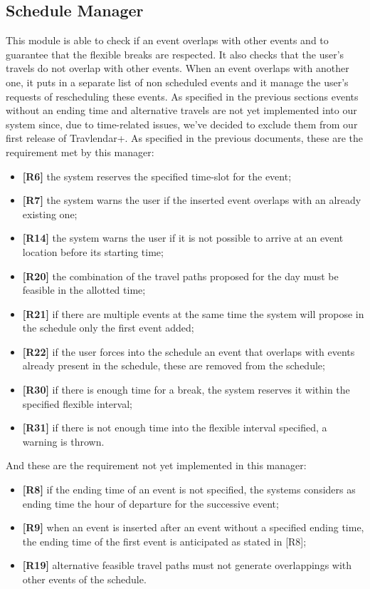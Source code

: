 \subsection{Schedule Manager}
This module is able to check if an event overlaps with other events and to guarantee that the flexible breaks are respected. It also checks that the user's travels do not overlap with other events. When an event overlaps with another one, it puts in a separate list of non scheduled events and it manage the user's requests of rescheduling these events.
As specified in the previous sections events without an ending time and alternative travels are not yet implemented into our system since, due to time-related issues, we've decided to exclude them from our first release of Travlendar+.
As specified in the previous documents, these are the requirement met by this manager:
\begin{itemize}
	\item \textbf{[R6]} the system reserves the specified time-slot for the event;
	\item \textbf{[R7]} the system warns the user if the inserted event overlaps with an already existing one;
	\item \textbf{[R14]} the system warns the user if it is not possible to arrive at an event location before its starting time;
	\item \textbf{[R20]} the combination of the travel paths proposed for the day must be feasible in the allotted time;
	\item \textbf{[R21]} if there are multiple events at the same time the system will propose in the schedule only the first event added;
	\item \textbf{[R22]} if the user forces into the schedule an event that overlaps with events already present in the schedule, these are removed from the schedule;
	\item \textbf{[R30]} if there is enough time for a break, the system reserves it within the specified flexible interval;
	\item \textbf{[R31]} if there is not enough time into the flexible interval specified, a warning is thrown.
\end{itemize}

And these are the requirement not yet implemented in this manager:
\begin{itemize}
	\item \textbf{[R8]} if the ending time of an event is not specified, the systems considers as ending time the hour of departure for the successive event;
	\item \textbf{[R9]} when an event is inserted after an event without a specified ending time, the ending time  of the first event is anticipated as stated in [R8];
	\item \textbf{[R19]} alternative feasible travel paths must not generate overlappings with other events of the schedule.
\end{itemize}


